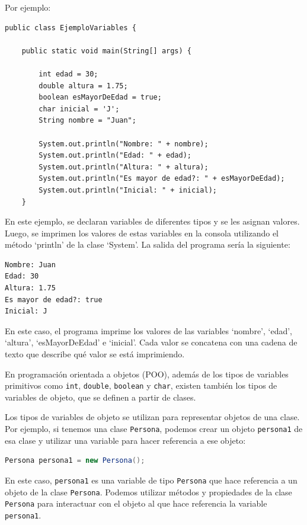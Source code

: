 \documentclass[executivepaper]{article}
\begin{document}
Por ejemplo:
\begin{lstlisting}
public class EjemploVariables {

    public static void main(String[] args) {

        int edad = 30;
        double altura = 1.75;
        boolean esMayorDeEdad = true;
        char inicial = 'J';
        String nombre = "Juan";

        System.out.println("Nombre: " + nombre);
        System.out.println("Edad: " + edad);
        System.out.println("Altura: " + altura);
        System.out.println("Es mayor de edad?: " + esMayorDeEdad);
        System.out.println("Inicial: " + inicial);
    }
\end{lstlisting}

En este ejemplo, se declaran variables de diferentes tipos y se les asignan valores. Luego, se imprimen los valores de estas variables en la consola utilizando el método \enquote*{println} de la clase \enquote*{System}. La salida del programa sería la siguiente:
\begin{lstlisting}[numbers=none]
Nombre: Juan
Edad: 30
Altura: 1.75
Es mayor de edad?: true
Inicial: J
\end{lstlisting}
En este caso, el programa imprime los valores de las variables \enquote*{nombre}, \enquote*{edad}, \enquote*{altura}, \enquote*{esMayorDeEdad} e \enquote*{inicial}. Cada valor se concatena con una cadena de texto que describe qué valor se está imprimiendo.

En programación orientada a objetos (POO), además de los tipos de variables primitivos como \lstinline{int}, \lstinline{double}, \lstinline{boolean} y \lstinline{char}, existen también los tipos de variables de objeto, que se definen a partir de clases.

Los tipos de variables de objeto se utilizan para representar objetos de una clase. Por ejemplo, si tenemos una clase \lstinline{Persona}, podemos crear un objeto \lstinline{persona1} de esa clase y utilizar una variable para hacer referencia a ese objeto:

\begin{lstlisting}[language=Java]
Persona persona1 = new Persona();
\end{lstlisting}

En este caso, \lstinline{persona1} es una variable de tipo \lstinline{Persona} que hace referencia a un objeto de la clase \lstinline{Persona}. Podemos utilizar métodos y propiedades de la clase \lstinline{Persona} para interactuar con el objeto al que hace referencia la variable \lstinline{persona1}.
\end{document}
